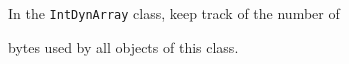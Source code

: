 In the \texttt{IntDynArray} class, keep track of the number of

bytes used by all objects of this class.


